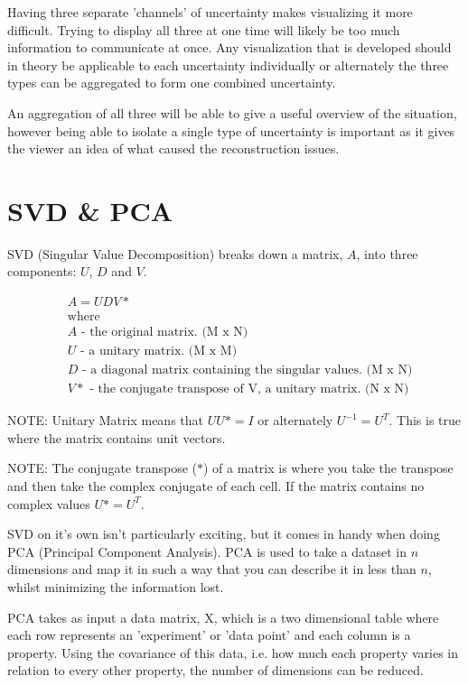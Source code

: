 Having three separate 'channels' of uncertainty makes visualizing it more difficult. Trying to display all three at one time will likely be too much information to communicate at once. Any visualization that is developed should in theory be applicable to each uncertainty individually or alternately the three types can be aggregated to form one combined uncertainty.

An aggregation of all three will be able to give a useful overview of the situation, however being able to isolate a single type of uncertainty is important as it gives the viewer an idea of what caused the reconstruction issues.

\newpage
\section{SVD \& PCA}\label{background:svdpca}
SVD (Singular Value Decomposition) breaks down a matrix, $A$, into three components: $U$, $D$ and $V$.

\begin{align}
& A = UDV* \nonumber \\
& \text{where} \nonumber \\
& A \text{ - the original matrix. (M x N)} \nonumber \\
& U \text{ - a unitary matrix. (M x M)} \nonumber \\
& D \text{ - a diagonal matrix containing the singular values. (M x N)} \nonumber \\
& V* \text{ - the conjugate transpose of V, a unitary matrix. (N x N)} \nonumber
\end{align}

NOTE: Unitary Matrix means that $UU* = I$ or alternately $U^{-1} = U^T$. This is true where the matrix contains unit vectors.

NOTE: The conjugate transpose ($*$) of a matrix is where you take the transpose and then take the complex conjugate of each cell. If the matrix contains no complex values $U* = U^T$.

SVD on it’s own isn’t particularly exciting, but it comes in handy when doing PCA (Principal Component Analysis). PCA is used to take a dataset in $n$ dimensions and map it in such a way that you can describe it in less than $n$, whilst minimizing the information lost.

PCA takes as input a data matrix, X, which is a two dimensional table where each row represents an 'experiment' or 'data point' and each column is a property. Using the covariance of this data, i.e. how much each property varies in relation to every other property, the number of dimensions can be reduced.

